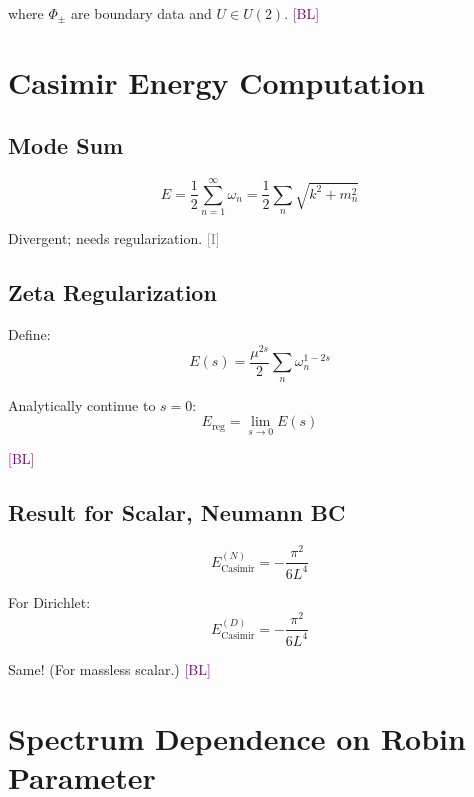 \documentclass[11pt,a4paper]{article}
\newcommand{\tagI}{\textcolor{gray}{[I]}}
\newcommand{\tagBL}{\textcolor{purple}{[BL]}}
\begin{document}
where $\Phi_\pm$ are boundary data and $U \in U(2)$. \tagBL

\section{Casimir Energy Computation}
\label{app:casimir}

\subsection{Mode Sum}

\begin{equation}
\label{eq:app-mode-sum}
E = \frac{1}{2} \sum_{n=1}^{\infty} \omega_n = \frac{1}{2} \sum_n \sqrt{k^2 + m_n^2}
\end{equation}

Divergent; needs regularization. \tagI

\subsection{Zeta Regularization}

Define:
\begin{equation}
\label{eq:app-zeta-reg}
E(s) = \frac{\mu^{2s}}{2} \sum_n \omega_n^{1-2s}
\end{equation}

Analytically continue to $s = 0$:
\begin{equation}
\label{eq:app-zeta-result}
E_{\text{reg}} = \lim_{s \to 0} E(s)
\end{equation}

\tagBL

\subsection{Result for Scalar, Neumann BC}

\begin{equation}
\label{eq:app-casimir-N}
E_{\text{Casimir}}^{(N)} = -\frac{\pi^2}{6L^4}
\end{equation}

For Dirichlet:
\begin{equation}
\label{eq:app-casimir-D}
E_{\text{Casimir}}^{(D)} = -\frac{\pi^2}{6L^4}
\end{equation}

Same! (For massless scalar.) \tagBL

\section{Spectrum Dependence on Robin Parameter}
\label{app:robin-spectrum}
\end{document}
